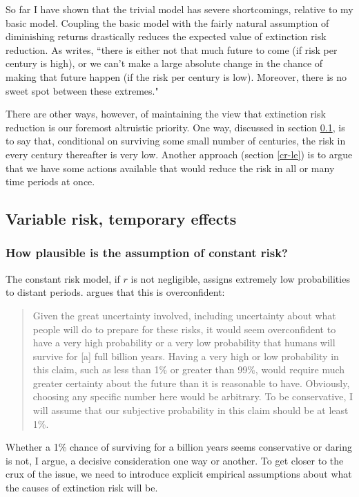 \documentclass[british]{article}
\begin{document}
So far I have shown that the trivial model has severe shortcomings, relative to my basic model. Coupling the basic model with the fairly natural assumption of diminishing returns drastically reduces
the expected value of extinction risk reduction. As \cite{ord_modelling_2014} writes, ``there is either not that much future to come (if risk per century is high), or we can’t make a large absolute change in the chance of making that future happen (if the risk per century is low). Moreover, there is no sweet spot between these extremes."

There are other ways, however, of maintaining the view that extinction risk reduction is our foremost altruistic priority. One way, discussed in section \ref{vr-te}, is to say that, conditional on surviving some small number of centuries, the risk in every century thereafter is very low. Another approach (section \ref{cr-le}) is to argue that we have some actions available that would reduce the risk in all or many time periods at once.

\subsection{Variable risk, temporary effects}\label{vr-te}

\subsubsection{How plausible is the assumption of constant risk?} The constant risk model, if $r$ is not negligible, assigns extremely low probabilities to distant periods. \cite{beckstead_overwhelming_2013-2} argues that this is overconfident:

\begin{quote}
Given the great uncertainty involved, including uncertainty about what people will do to prepare for these risks, it would seem overconfident to have a very high probability or a very low probability that humans will survive for [a] full billion years. Having a very high or low probability in this claim, such as less than 1\% or greater than 99\%, would require much greater certainty about the future than it is reasonable to have. Obviously, choosing any specific number here would be arbitrary. To be conservative, I will assume that our subjective probability in this claim should be at least 1\%.
\end{quote}

Whether a 1\% chance of surviving for a billion years seems conservative or daring is not, I argue, a decisive consideration one way or another. To get closer to the crux of the issue, we need to introduce explicit empirical assumptions about what the causes of extinction risk will be.
\end{document}
